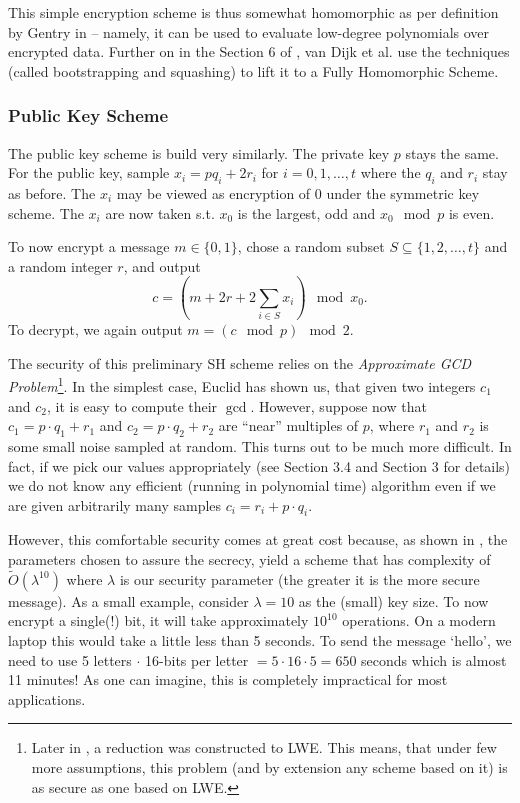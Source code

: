 This simple encryption scheme is thus somewhat homomorphic as per definition by Gentry in \cite{gentry_phd} – namely, it can be used to evaluate low-degree polynomials over encrypted data. Further on in the Section 6 of \cite{int_scheme}, van Dijk et al. use the techniques (called bootstrapping and squashing) to lift it to a Fully Homomorphic Scheme.
\subsubsection*{Public Key Scheme}
The public key scheme is build very similarly. The private key $p$ stays the same. For the public key, sample $x_i = p q_i + 2r_i$ for $i = 0, 1, \dots, t$ where the $q_i$ and $r_i$ stay as before. The $x_i$ may be viewed as encryption of 0 under the symmetric key scheme. The $x_i$ are now taken s.t. $x_0$ is the largest, odd and $x_0 \mod p$ is even.

To now encrypt a message $m \in \{0,1\}$, chose a random subset $S \subseteq \{1, 2, \dots, t\}$ and a random integer $r$, and output
\begin{equation} c = (m + 2r + 2\sum_{i \in S} x_i) \mod x_0.\end{equation}
To decrypt, we again output $m = (c \mod p) \mod 2$.

The security of this preliminary SH scheme relies on the \textit{Approximate GCD Problem}\footnote{Later in \cite{revisited}, a reduction was constructed to LWE. This means, that under few more assumptions, this problem (and by extension any scheme based on it) is as secure as one based on LWE.}. In the simplest case, Euclid has shown us, that given two integers $c_1$ and $c_2$, it is easy to compute their $\gcd$. However, suppose now that $c_1 = p \cdot q_1 + r_1$ and $c_2 = p \cdot q_2 + r_2$ are ``near'' multiples of $p$, where $r_1$ and $r_2$ is some small noise sampled at random. This turns out to be much more difficult. In fact, if we pick our values appropriately (see \cite{easy_fhe} Section 3.4 and \cite{int_scheme} Section 3 for details) we do not know any efficient (running in polynomial time) algorithm even if we are given arbitrarily many samples $c_i = r_i + p \cdot q_i$.

However, this comfortable security comes at great cost because, as shown in \cite{int_scheme}, the parameters chosen to assure the secrecy, yield a scheme that has complexity of $\tilde{O}(\lambda^{10})$ where $\lambda$ is our security parameter (the greater it is the more secure message). As a small example, consider $\lambda = 10$ as the (small) key size. To now encrypt a single(!) bit, it will take approximately $10^{10}$ operations. On a modern laptop this would take a little less than 5 seconds. To send the message `hello', we need to use 5 letters $\cdot$ 16-bits per letter $= 5\cdot 16\cdot5 = 650$ seconds which is almost 11 minutes! As one can imagine, this is completely impractical for most applications.

